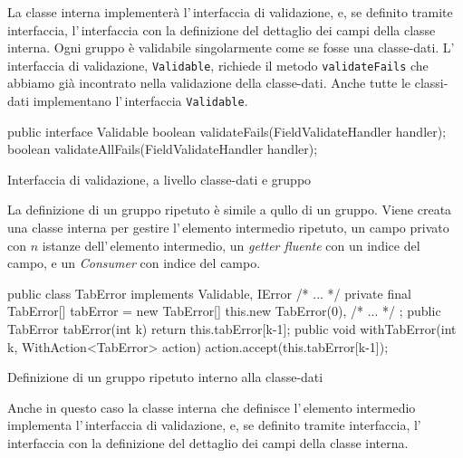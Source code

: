 La classe interna implementerà l'\,interfaccia di validazione, e, se definito
tramite interfaccia, l'\,interfaccia con la definizione del dettaglio dei campi
della classe interna.
Ogni gruppo è validabile singolarmente come se fosse una classe-dati.
L'\,interfaccia di validazione, \texttt{Validable}, richiede il metodo
\texttt{validateFails} che abbiamo già incontrato nella validazione della
classe-dati. Anche tutte le classi-dati implementano l'\,interfaccia 
\texttt{Validable}.

\begin{elisting}[!htb]
\begin{javacode}
public interface Validable {
    boolean validateFails(FieldValidateHandler handler);
    boolean validateAllFails(FieldValidateHandler handler);
}
\end{javacode}
\caption{Interfaccia di validazione, a livello classe-dati e gruppo}
\label{lst:if.validable}
\end{elisting}

La definizione di un gruppo ripetuto è simile a qullo di un gruppo.
Viene creata una classe interna per gestire l'\,elemento 
intermedio ripetuto, un campo privato con $n$ istanze dell'\,elemento 
intermedio, un \textit{getter fluente} con un indice del campo, 
e un \textit{Consumer} con indice del campo.

\begin{elisting}[!htb]
\begin{javacode}
    public class TabError implements Validable, IError {/* ... */}
    private final TabError[] tabError = new TabError[] {
        this.new TabError(0),
        /* ... */
    };
    public TabError tabError(int k) { return this.tabError[k-1]; }
    public void withTabError(int k, WithAction<TabError> action) { action.accept(this.tabError[k-1]); }
\end{javacode}
\caption{Definizione di un gruppo ripetuto interno alla classe-dati}
\label{lst:occ.indef}
\end{elisting}

Anche in questo caso la classe interna che definisce l'\,elemento intermedio 
implementa l'\,interfaccia di validazione, e, se definito tramite interfaccia, 
l'\,interfaccia con la definizione del dettaglio dei campi della classe interna.



